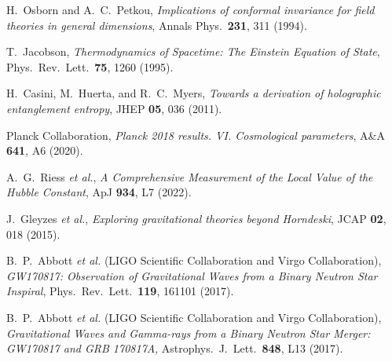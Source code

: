\documentclass[aps,prd,onecolumn,notitlepage,superscriptaddress,nofootinbib]{revtex4-2}
\begin{document}
\begin{thebibliography}{99}

H.~Osborn and A.~C.~Petkou,
\emph{Implications of conformal invariance for field theories in general dimensions},
Annals Phys.\ \textbf{231}, 311 (1994).

T.~Jacobson, \emph{Thermodynamics of Spacetime: The Einstein Equation of State}, Phys.\ Rev.\ Lett.\ \textbf{75}, 1260 (1995).

H.~Casini, M.~Huerta, and R.~C.~Myers, \emph{Towards a derivation of holographic entanglement entropy}, JHEP \textbf{05}, 036 (2011).

Planck Collaboration, \emph{Planck 2018 results. VI. Cosmological parameters}, A\&A \textbf{641}, A6 (2020).

A.~G.~Riess \emph{et al.}, \emph{A Comprehensive Measurement of the Local Value of the Hubble Constant}, ApJ \textbf{934}, L7 (2022).

J.~Gleyzes \emph{et al.}, \emph{Exploring gravitational theories beyond Horndeski}, JCAP \textbf{02}, 018 (2015).

B.~P.~Abbott \emph{et al.} (LIGO Scientific Collaboration and Virgo Collaboration), \emph{GW170817: Observation of Gravitational Waves from a Binary Neutron Star Inspiral}, Phys.\ Rev.\ Lett.\ \textbf{119}, 161101 (2017).

B.~P.~Abbott \emph{et al.} (LIGO Scientific Collaboration and Virgo Collaboration), \emph{Gravitational Waves and Gamma-rays from a Binary Neutron Star Merger: GW170817 and GRB 170817A}, Astrophys.\ J.\ Lett.\ \textbf{848}, L13 (2017).

\end{thebibliography}
\end{document}
